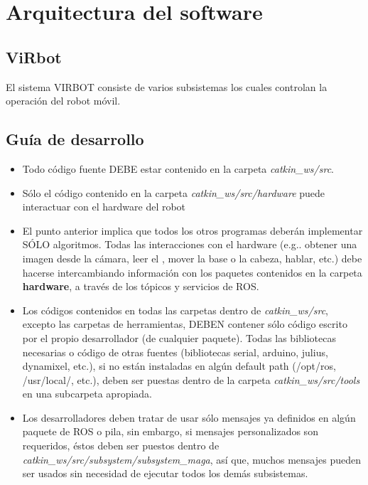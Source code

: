 \documentclass[user_manual.tex]{subfiles}
\begin{document}
 
 \chapter{Arquitectura del software}

\section{ViRbot}
El sistema VIRBOT consiste de varios subsistemas los cuales controlan la operación del robot móvil.

\section{Guía de desarrollo}
\begin{itemize}
 \item Todo código fuente DEBE estar contenido en la carpeta \textit{catkin\_ws/src}.\\
 
 \item Sólo el código contenido en la carpeta \textit{catkin\_ws/src/hardware} puede interactuar con el 
 hardware del robot\\
 
 \item El punto anterior implica que todos los otros programas deberán implementar SÓLO algoritmos. 
 Todas las interacciones con el hardware (e.g.. obtener una imagen desde la cámara, leer el , 
 mover la base o la cabeza, hablar, etc.) debe hacerse intercambiando información con los paquetes
 contenidos en la carpeta \textbf{hardware}, a través de los tópicos y servicios de ROS.
 
 \item Los códigos contenidos en todas las carpetas dentro de \textit{catkin\_ws/src}, excepto las carpetas de 
 herramientas, DEBEN contener sólo código escrito por el propio desarrollador (de cualquier paquete).
 Todas las bibliotecas necesarias o código de otras fuentes (bibliotecas serial, arduino, julius,
 dynamixel, etc.), si no están instaladas en algún default path (/opt/ros, /usr/local/, etc.), deben 
 ser puestas dentro de la carpeta \textit{catkin\_ws/src/tools} en una subcarpeta apropiada.\\
 
 \item Los desarrolladores deben tratar de usar sólo mensajes ya definidos en algún paquete de ROS o
 pila, sin embargo, si mensajes personalizados son requeridos, éstos deben ser puestos dentro de
 \textit{catkin\_ws/src/subsystem/subsystem\_maga}, así que, muchos mensajes pueden ser usados sin necesidad
 de ejecutar todos los demás subsistemas.\\
\end{itemize}
\end{document}

